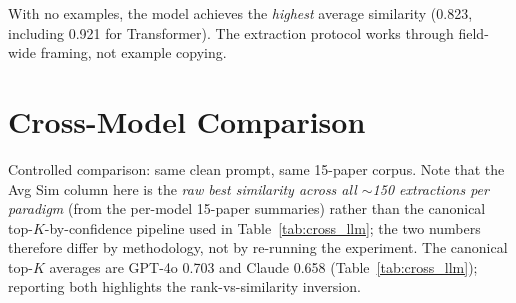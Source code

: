 \documentclass[11pt]{article}
\begin{document}
\begin{table}[h]
\centering
\caption{Few-shot leakage test (15 papers, 4 primary shifts).}
\label{tab:fewshot_leakage}
\footnotesize
\setlength{\tabcolsep}{4pt}
\end{table}

With no examples, the model achieves the \emph{highest} average similarity (0.823, including 0.921 for Transformer). The extraction protocol works through field-wide framing, not example copying.

\section{Cross-Model Comparison}\label{app:crossmodel}

Controlled comparison: same clean prompt, same 15-paper corpus. Note that the Avg Sim column here is the \emph{raw best similarity across all $\sim$150 extractions per paradigm} (from the per-model 15-paper summaries) rather than the canonical top-$K$-by-confidence pipeline used in Table~\ref{tab:cross_llm}; the two numbers therefore differ by methodology, not by re-running the experiment. The canonical top-$K$ averages are GPT-4o 0.703 and Claude 0.658 (Table~\ref{tab:cross_llm}); reporting both highlights the rank-vs-similarity inversion.

\begin{table}[h]
\centering
\caption{Cross-model raw best similarity. Avg Sim = mean over the 4 primary shifts of the highest cosine similarity achieved by \emph{any} extraction (regardless of confidence rank). GPT-4o values reproduce the quarantined \texttt{summary\_STALE\_similarity\_reranked.json} artifact, retained for cross-reference; the canonical (top-$K$-by-confidence) average is 0.703 (Table~\ref{tab:cross_llm}).}
\label{tab:crossmodel_app}
\footnotesize
\setlength{\tabcolsep}{4pt}
\end{table}
\end{document}
